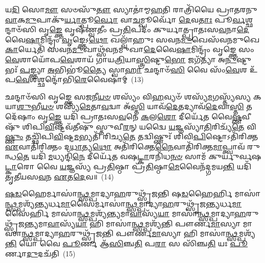 {\anuvakamend[{\-\ul{𑌆}\-\-\ul{𑌦𑌿}\-𑌤𑍍𑌯𑌸𑍍𑌤\-\ul{𑌸𑍍𑌯𑍈}\-𑌵 𑌦𑍍𑌵𑍇 𑌚᳴}]}%

𑌯\-\ul{𑌦𑌿} 𑌸𑍋\-\ul{𑌮𑍗} 𑌸𑍞𑌸𑍁᳴\-\ul{𑌤𑍗} 𑌸𑍍𑌯𑌾𑌤𑌾॑𑌮𑍍𑌮\-\ul{𑌹}\-𑌤𑌿 𑌰𑌾𑌤𑍍𑌰𑌿᳴𑌯𑍈 𑌪𑍍𑌰𑌾𑌤𑌰𑌨𑍁\-\ul{𑌵𑌾}\-𑌕\-\ul{𑌮𑍁}\-𑌪𑌾𑌕𑍁᳴\-\ul{𑌰𑍍𑌯𑌾}\-𑌤𑍍𑌪𑍂\-\ul{𑌰𑍍𑌵𑍋} 𑌵𑌾\-\ul{𑌚}\-𑌮𑍍𑌪𑍂𑌰𑍍𑌵𑍋᳴ \ul{𑌦𑍇}\-𑌵\-\ul{𑌤𑌾𑌃} 𑌪𑍂\-\ul{𑌰𑍍𑌵}\-𑌶𑍍𑌛𑌨𑍍𑌦𑌾𑍞᳴𑌸𑌿 𑌵𑍃\-\ul{𑌙𑍍𑌕𑍍𑌤𑍇} 𑌵𑍃𑌷᳴𑌣𑍍𑌵𑌤𑍀𑌂 𑌪𑍍𑌰\-\ul{𑌤𑌿}\-𑌪𑌦𑌂᳴ 𑌕𑍁𑌰𑍍𑌯𑌾𑌤𑍍𑌪𑍍𑌰𑌾𑌤𑌃𑌸\-\ul{𑌵}\-𑌨𑌾\-\ul{𑌦𑍇}\-𑌵𑍈\-\ul{𑌷𑌾}\-𑌮𑌿𑌨𑍍𑌦𑍍𑌰𑌂᳴ \ul{𑌵𑍃}\-𑌙𑍍𑌕𑍍𑌤𑍇\-𑌽\-\ul{𑌥𑍋} 𑌖𑌲𑍍𑌵𑌾᳴𑌹𑍁𑌃 𑌸𑌵𑌨\-\ul{𑌮𑍁}\-𑌖𑍇𑌸᳴𑌵𑌨𑌮𑍁𑌖𑍇 \ul{𑌕𑌾}\-𑌰𑍍𑌯𑍇𑌤𑌿᳴ 𑌸𑌵𑌨\-\ul{𑌮𑍁}\-𑌖𑌾𑌥𑍍𑌸᳴𑌵𑌨𑌮𑍁𑌖𑌾\-\ul{𑌦𑍇}\-𑌵𑍈\-\ul{𑌷𑌾}\-𑌮𑌿𑌨𑍍𑌦𑍍𑌰𑌂᳴ 𑌵𑍃𑌙𑍍𑌕𑍍𑌤𑍇 𑌸𑌂\-\ul{𑌵𑍇}\-𑌶𑌾𑌯𑍋᳴𑌪\-\ul{𑌵𑍇}\-𑌶𑌾𑌯᳴ 𑌗𑌾𑌯\-\ul{𑌤𑍍𑌰𑌿}\-𑌯𑌾\-\ul{𑌸𑍍𑌤𑍍𑌰𑌿}\-𑌷𑍍𑌟𑍁\-\ul{𑌭𑍋} 𑌜𑌗᳴𑌤𑍍𑌯𑌾 𑌅\-\ul{𑌨𑍁}\-𑌷𑍍𑌟𑍁𑌭𑌃᳴ \ul{𑌪}\-𑌙𑍍𑌕𑍍𑌤𑍍𑌯𑌾 \ul{𑌅}\-𑌭𑌿𑌭𑍂॑\-\ul{𑌤𑍍𑌯𑍈} 𑌸𑍍𑌵𑌾\-\ul{𑌹𑌾} 𑌛𑌨𑍍𑌦𑌾𑍞᳴\-\ul{𑌸𑌿} 𑌵𑍈 𑌸𑌂᳴\-\ul{𑌵𑍇}\-𑌶 𑌉᳴𑌪\-\ul{𑌵𑍇}\-𑌶𑌶𑍍𑌛𑌨𑍍𑌦𑍋᳴𑌭𑌿\-\ul{𑌰𑍇}\-𑌵𑍈𑌷𑌾॑𑌮𑍍~(13)

𑌛𑌨𑍍𑌦𑌾𑍞᳴𑌸𑌿 𑌵𑍃𑌙𑍍𑌕𑍍𑌤𑍇 𑌸\-\ul{𑌜}\-𑌨𑍀\-\ul{𑌯}\-\-\ul{𑍞} 𑌶𑌸𑍍𑌯𑌂᳴ 𑌵𑌿\-\ul{𑌹}\-𑌵𑍍𑌯𑍞᳴ 𑌶𑌸𑍍𑌯᳴\-\ul{𑌮}\-𑌗𑌸𑍍𑌤𑍍𑌯᳴𑌸𑍍𑌯 𑌕𑌯𑌾\-\ul{𑌶𑍁}\-𑌭𑍀\-\ul{𑌯}\-\-\ul{𑍞} 𑌶𑌸𑍍𑌯᳴\-\ul{𑌮𑍇}\-𑌤𑌾\-\ul{𑌵}\-𑌦𑍍𑌵𑌾 𑌅᳴\-\ul{𑌸𑍍𑌤𑌿} 𑌯𑌾𑌵᳴\-\ul{𑌦𑍇}\-𑌤𑌦𑍍𑌯𑌾𑌵᳴\-\ul{𑌦𑍇}\-𑌵𑌾\-\ul{𑌸𑍍𑌤𑌿} 𑌤𑌦𑍇᳴𑌷𑌾𑌂 𑌵𑍃\-\ul{𑌙𑍍𑌕𑍍𑌤𑍇} 𑌯𑌦𑌿᳴ 𑌪𑍍𑌰𑌾𑌤𑌃𑌸\-\ul{𑌵}\-𑌨𑍇 \ul{𑌕}\-𑌲\-\ul{𑌶𑍋} 𑌦𑍀𑌰𑍍𑌯𑍇᳴𑌤 𑌵𑍈\-\ul{𑌷𑍍𑌣}\-𑌵𑍀𑌷𑍁᳴ 𑌶𑌿𑌪𑌿\-\ul{𑌵𑌿}\-𑌷𑍍𑌟𑌵᳴𑌤𑍀𑌷𑍁 𑌸𑍍𑌤𑍁𑌵𑍀\-\ul{𑌰}\-𑌨𑍍 𑌯𑌦𑍍𑌵𑍈 \ul{𑌯}\-𑌜𑍍𑌞𑌸𑍍𑌯𑌾᳴\-\ul{𑌤𑌿}\-𑌰𑌿𑌚𑍍𑌯᳴\-\ul{𑌤𑍇} 𑌵𑌿\-\ul{𑌷𑍍𑌣𑍁𑌂} 𑌤𑌚𑍍𑌛𑌿᳴𑌪𑌿\-\ul{𑌵𑌿}\-𑌷𑍍𑌟\-\ul{𑌮}\-𑌭𑍍𑌯𑌤𑌿᳴ 𑌰𑌿𑌚𑍍𑌯\-\ul{𑌤𑍇} 𑌤𑌦𑍍𑌵𑌿𑌷𑍍𑌣𑍁𑌃᳴ 𑌶𑌿𑌵𑌿\-\ul{𑌪𑌿}\-𑌷𑍍𑌟𑍋\-𑌽𑌤𑌿᳴𑌰𑌿𑌕𑍍𑌤 \ul{𑌏}\-𑌵𑌾𑌤𑌿᳴𑌰𑌿𑌕𑍍𑌤𑌂 𑌦\-\ul{𑌧𑌾}\-𑌤𑍍𑌯\-\ul{𑌥𑍋} 𑌅𑌤𑌿᳴𑌰𑌿𑌕𑍍𑌤𑍇\-\ul{𑌨𑍈}\-𑌵𑌾𑌤𑌿᳴𑌰𑌿𑌕𑍍𑌤\-\ul{𑌮𑌾}\-𑌪𑍍𑌤𑍍𑌵𑌾𑌵᳴ 𑌰𑍁𑌨𑍍𑌧\-\ul{𑌤𑍇} 𑌯𑌦𑌿᳴ \ul{𑌮}\-𑌧𑍍𑌯𑌨𑍍𑌦𑌿᳴\-\ul{𑌨𑍇} 𑌦𑍀𑌰𑍍𑌯𑍇᳴𑌤 𑌵𑌷\-\ul{𑌟𑍍𑌕𑌾}\-𑌰𑌨𑌿᳴𑌧\-\ul{𑌨}\-\-\ul{𑍞} 𑌸𑌾𑌮᳴ 𑌕𑍁𑌰𑍍𑌯𑍁𑌰𑍍𑌵𑌷\-\ul{𑌟𑍍𑌕𑌾}\-𑌰𑍋 𑌵𑍈 \ul{𑌯}\-𑌜𑍍𑌞𑌸𑍍𑌯᳴ 𑌪𑍍𑌰\-\ul{𑌤𑌿}\-𑌷𑍍𑌠𑌾 𑌪𑍍𑌰᳴\-\ul{𑌤𑌿}\-𑌷𑍍𑌠𑌾\-\ul{𑌮𑍇}\-𑌵𑍈𑌨᳴𑌦𑍍𑌗𑌮𑌯\-\ul{𑌨𑍍𑌤𑌿} 𑌯𑌦𑌿᳴ 𑌤𑍃𑌤𑍀𑌯𑌸\-\ul{𑌵}\-𑌨 \ul{𑌏}\-𑌤\-\ul{𑌦𑍇}\-𑌵॥~(14)


{\anuvakamend[{𑌛𑌨𑍍𑌦𑍋᳴𑌭𑌿\-\ul{𑌰𑍇}\-𑌵𑍈\-\ul{𑌷𑌾}\-𑌮𑌵𑍈\-\ul{𑌕𑌾}\-𑌨𑍍𑌨𑌵𑌿𑍞᳴\-\ul{𑌶}\-𑌤𑌿𑌶𑍍𑌚᳴}]}%

\-\ul{𑌷}\-\-\ul{𑌡}\-𑌹𑍈𑌰𑍍𑌮𑌾𑌸𑌾॑\-\ul{𑌨𑍍𑌥𑍍𑌸}\-𑌮𑍍𑌪𑌾𑌦𑍍𑌯𑌾\-\ul{𑌹}\-𑌰𑍁𑌥𑍍𑌸𑍃᳴𑌜𑌨𑍍𑌤𑌿 𑌷\-\ul{𑌡}\-𑌹𑍈𑌰𑍍\mbox{}𑌹𑌿 𑌮𑌾𑌸𑌾॑\-\ul{𑌨𑍍𑌥𑍍𑌸}\-𑌮𑍍𑌪𑌶𑍍𑌯᳴𑌨𑍍𑌤𑍍𑌯𑌰𑍍𑌧\-\ul{𑌮𑌾}\-𑌸𑍈𑌰𑍍𑌮𑌾𑌸𑌾॑\-\ul{𑌨𑍍𑌥𑍍𑌸}\-𑌮𑍍𑌪𑌾𑌦𑍍𑌯𑌾\-\ul{𑌹}\-𑌰𑍁𑌥𑍍𑌸𑍃᳴𑌜𑌨𑍍𑌤𑍍𑌯𑌰𑍍𑌧\-\ul{𑌮𑌾}\-𑌸𑍈𑌰𑍍\mbox{}𑌹𑌿 𑌮𑌾𑌸𑌾॑\-\ul{𑌨𑍍𑌥𑍍𑌸}\-𑌮𑍍𑌪𑌶𑍍𑌯᳴𑌨𑍍𑌤𑍍𑌯𑌮𑌾\-\ul{𑌵𑌾}\-𑌸𑍍𑌯᳴\-\ul{𑌯𑌾} 𑌮𑌾𑌸𑌾॑\-\ul{𑌨𑍍𑌥𑍍𑌸}\-𑌮𑍍𑌪𑌾𑌦𑍍𑌯𑌾\-\ul{𑌹}\-𑌰𑍁𑌥𑍍𑌸𑍃᳴𑌜𑌨𑍍𑌤𑍍𑌯𑌮𑌾\-\ul{𑌵𑌾}\-𑌸𑍍𑌯᳴\-\ul{𑌯𑌾} 𑌹𑌿 𑌮𑌾𑌸𑌾॑\-\ul{𑌨𑍍𑌥𑍍𑌸}\-𑌮𑍍𑌪𑌶𑍍𑌯᳴𑌨𑍍𑌤𑌿 𑌪𑍗𑌰𑍍𑌣\-\ul{𑌮𑌾}\-𑌸𑍍𑌯𑌾 𑌮𑌾𑌸𑌾॑\-\ul{𑌨𑍍𑌥𑍍𑌸}\-𑌮𑍍𑌪𑌾𑌦𑍍𑌯𑌾\-\ul{𑌹}\-𑌰𑍁𑌥𑍍𑌸𑍃᳴𑌜𑌨𑍍𑌤𑌿 𑌪𑍗𑌰𑍍𑌣\-\ul{𑌮𑌾}\-𑌸𑍍𑌯𑌾 𑌹𑌿 𑌮𑌾𑌸𑌾॑\-\ul{𑌨𑍍𑌥𑍍𑌸}\-𑌮𑍍𑌪𑌶𑍍𑌯᳴\-\ul{𑌨𑍍𑌤𑌿} 𑌯𑍋 𑌵𑍈 \ul{𑌪𑍂}\-𑌰𑍍𑌣 𑌆᳴\-\ul{𑌸𑌿}\-𑌞𑍍𑌚\-\ul{𑌤𑌿} 𑌪\-\ul{𑌰𑌾} 𑌸 𑌸𑌿᳴𑌞𑍍𑌚\-\ul{𑌤𑌿} 𑌯𑌃 \ul{𑌪𑍂}\-𑌰𑍍𑌣𑌾\-\ul{𑌦𑍁}\-𑌦𑌚᳴𑌤𑌿~(15)

